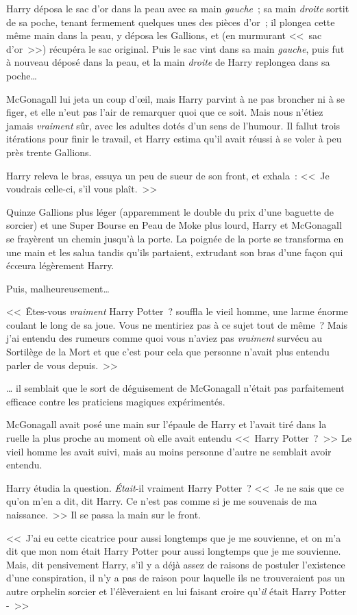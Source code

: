 Harry déposa le sac d'or dans la peau avec sa main \emph{gauche}~; sa main \emph{droite} sortit de sa poche, tenant fermement quelques unes des pièces d'or~; il plongea cette même main dans la peau, y déposa les Gallions, et (en murmurant <<~sac d'or~>>) récupéra le sac original. Puis le sac vint dans sa main \emph{gauche}, puis fut à nouveau déposé dans la peau, et la main \emph{droite} de Harry replongea dans sa poche…

McGonagall lui jeta un coup d'œil, mais Harry parvint à ne pas broncher ni à se figer, et elle n'eut pas l'air de remarquer quoi que ce soit. Mais nous n'étiez jamais \emph{vraiment} sûr, avec les adultes dotés d'un sens de l'humour. Il fallut trois itérations pour finir le travail, et Harry estima qu'il avait réussi à se voler à peu près trente Gallions.

Harry releva le bras, essuya un peu de sueur de son front, et exhala~: <<~Je voudrais celle-ci, s'il vous plaît.~>>

Quinze Gallions plus léger (apparemment le double du prix d'une baguette de sorcier) et une Super Bourse en Peau de Moke  plus lourd, Harry et McGonagall se frayèrent un chemin jusqu'à la porte. La poignée de la porte se transforma en une main et les salua tandis qu'ils partaient, extrudant son bras d'une façon qui écœura légèrement Harry.

Puis, malheureusement…

<<~Êtes-vous \emph{vraiment} Harry Potter~? souffla le vieil homme, une larme énorme coulant le long de sa joue. Vous ne mentiriez pas à ce sujet tout de même~? Mais j'ai entendu des rumeurs comme quoi vous n'aviez pas \emph{vraiment} survécu au Sortilège de la Mort et que c'est pour cela que personne n'avait plus entendu parler de vous depuis.~>>

… il semblait que le sort de déguisement de McGonagall n'était pas parfaitement efficace contre les praticiens magiques expérimentés.

McGonagall avait posé une main sur l'épaule de Harry et l'avait tiré dans la ruelle la plus proche au moment où elle avait entendu <<~Harry Potter~?~>> Le vieil homme les avait suivi, mais au moins personne d'autre ne semblait avoir entendu.

Harry étudia la question. \emph{Était}-il vraiment Harry Potter~? <<~Je ne sais que ce qu'on m'en a dit, dit Harry. Ce n'est pas comme si je me souvenais de ma naissance.~>> Il se passa la main sur le front.

<<~J'ai eu cette cicatrice pour aussi longtemps que je me souvienne, et on m'a dit que mon nom était Harry Potter pour aussi longtemps que je me souvienne. Mais, dit pensivement Harry, s'il y a déjà assez de raisons de postuler l'existence d'une conspiration, il n'y a pas de raison pour laquelle ils ne trouveraient pas un autre orphelin sorcier et l'élèveraient en lui faisant croire qu'\emph{il} était Harry Potter -~>>


